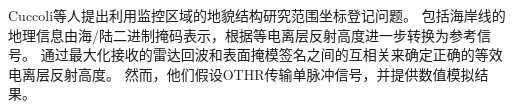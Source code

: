 Cuccoli\cite{cuccoli2011coordinate}等人提出利用监控区域的地貌结构研究范围坐标登记问题。 包括海岸线的地理信息由海/陆二进制掩码表示，根据等电离层反射高度进一步转换为参考信号。 通过最大化接收的雷达回波和表面掩模签名之间的互相关来确定正确的等效电离层反射高度。 然而，他们假设OTHR传输单脉冲信号，并提供数值模拟结果。
